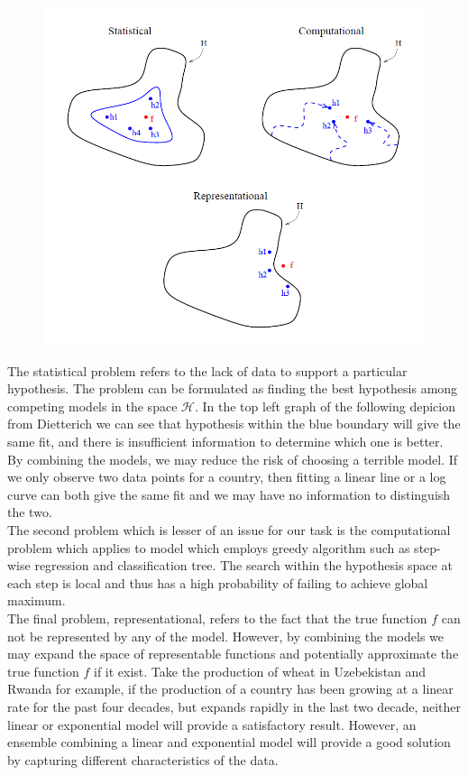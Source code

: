 \documentclass[nojss]{jss}\usepackage[]{graphicx}\usepackage[]{color}
\begin{document}
\begin{figure}[!ht]
  \centering
  \includegraphics[scale = 0.7]{dietterich.png}
\end{figure}


The statistical problem refers to the lack of data to support a
particular hypothesis. The problem can be formulated as finding the
best hypothesis among competing models in the space
$\mathbf{\mathcal{H}}$. In the top left graph of the following
depicion from Dietterich we can see that hypothesis within the blue
boundary will give the same fit, and there is insufficient information
to determine which one is better. By combining the models, we may
reduce the risk of choosing a terrible model. If we only observe two
data points for a country, then fitting a linear line or a log curve
can both give the same fit and we may have no information to
distinguish the two.\\

The second problem which is lesser of an issue for our task is the
computational problem which applies to model which employs greedy
algorithm such as step-wise regression and classification tree. The
search within the hypothesis space at each step is local and thus has
a high probability of failing to achieve global maximum.\\

The final problem, representational, refers to the fact that the true
function $f$ can not be represented by any of the model. However, by
combining the models we may expand the space of representable
functions and potentially approximate the true function $f$ if it
exist. Take the production of wheat in Uzebekistan and Rwanda for
example, if the production of a country has been growing at a linear
rate for the past four decades, but expands rapidly in the last two
decade, neither linear or exponential model will provide a
satisfactory result. However, an ensemble combining a linear and
exponential model will provide a good solution by capturing different
characteristics of the data.\\
\end{document}
